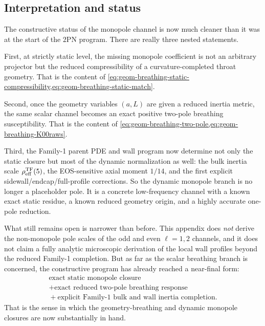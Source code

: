 \documentclass[11pt]{article}
\newcommand{\TwoPN}{\mathrm{2PN}}
\begin{document}
\subsection{Interpretation and status}
\label{app:geom-breathing-status}

The constructive status of the monopole channel is now much cleaner than it was at the
start of the \(\TwoPN\) program.
There are really three nested statements.

First, at strictly static level, the missing monopole coefficient is not an arbitrary
projector but the reduced compressibility of a curvature-completed throat geometry.
That is the content of
\cref{eq:geom-breathing-static-compressibility,eq:geom-breathing-static-match}.

Second, once the geometry variables \((a,L)\) are given a reduced inertia metric, the
same scalar channel becomes an exact positive two-pole breathing susceptibility.
That is the content of
\cref{eq:geom-breathing-two-pole,eq:geom-breathing-K00raws}.

Third, the Family-1 parent PDE and wall program now determine not only the static closure
but most of the dynamic normalization as well: the bulk inertia scale
\(\rho_{\rm eff}^{\rm TF}(5)\), the EOS-sensitive axial moment \(1/14\), and the first
explicit sidewall/endcap/full-profile corrections.
So the dynamic monopole branch is no longer a placeholder pole.
It is a concrete low-frequency channel with a known exact static residue, a known reduced
geometry origin, and a highly accurate one-pole reduction.

What still remains open is narrower than before.
This appendix does \emph{not} derive the non-monopole pole scales of the odd and even
\(\ell=1,2\) channels, and it does not claim a fully analytic microscopic derivation of
the local wall profiles beyond the reduced Family-1 completion.
But as far as the scalar breathing branch is concerned, the constructive program has
already reached a near-final form:
\begin{equation}
\boxed{
\begin{gathered}
\text{exact static monopole closure}\\
{}+\text{exact reduced two-pole breathing response}\\
{}+\text{explicit Family-1 bulk and wall inertia completion}.
\end{gathered}
}
\label{eq:geom-breathing-final-summary}
\end{equation}
That is the sense in which the geometry-breathing and dynamic monopole closures are now
substantially in hand.
\end{document}
